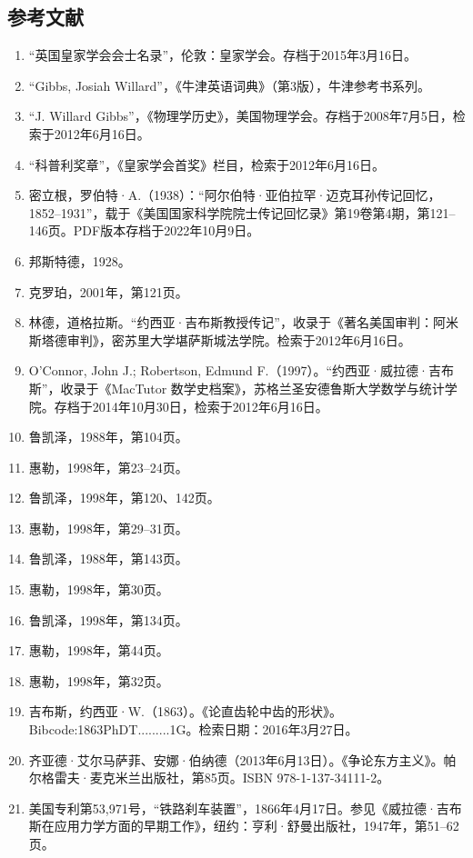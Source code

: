\subsection{参考文献}
\begin{enumerate}
\item “英国皇家学会会士名录”，伦敦：皇家学会。存档于2015年3月16日。
\item “Gibbs, Josiah Willard”，《牛津英语词典》（第3版），牛津参考书系列。
\item “J. Willard Gibbs”，《物理学历史》，美国物理学会。存档于2008年7月5日，检索于2012年6月16日。
\item “科普利奖章”，《皇家学会首奖》栏目，检索于2012年6月16日。
\item 密立根，罗伯特·A.（1938）：“阿尔伯特·亚伯拉罕·迈克耳孙传记回忆，1852–1931”，载于《美国国家科学院院士传记回忆录》第19卷第4期，第121–146页。PDF版本存档于2022年10月9日。
\item 邦斯特德，1928。
\item 克罗珀，2001年，第121页。
\item 林德，道格拉斯。“约西亚·吉布斯教授传记”，收录于《著名美国审判：阿米斯塔德审判》，密苏里大学堪萨斯城法学院。检索于2012年6月16日。
\item O'Connor, John J.; Robertson, Edmund F.（1997）。“约西亚·威拉德·吉布斯”，收录于《MacTutor 数学史档案》，苏格兰圣安德鲁斯大学数学与统计学院。存档于2014年10月30日，检索于2012年6月16日。
\item 鲁凯泽，1988年，第104页。
\item 惠勒，1998年，第23–24页。
\item 鲁凯泽，1998年，第120、142页。
\item 惠勒，1998年，第29–31页。
\item 鲁凯泽，1988年，第143页。
\item 惠勒，1998年，第30页。
\item 鲁凯泽，1998年，第134页。
\item 惠勒，1998年，第44页。
\item 惠勒，1998年，第32页。
\item 吉布斯，约西亚·W.（1863）。《论直齿轮中齿的形状》。Bibcode:1863PhDT.........1G。检索日期：2016年3月27日。
\item 齐亚德·艾尔马萨菲、安娜·伯纳德（2013年6月13日）。《争论东方主义》。帕尔格雷夫·麦克米兰出版社，第85页。ISBN 978-1-137-34111-2。
\item 美国专利第53,971号，“铁路刹车装置”，1866年4月17日。参见《威拉德·吉布斯在应用力学方面的早期工作》，纽约：亨利·舒曼出版社，1947年，第51–62页。

\end{enumerate}
